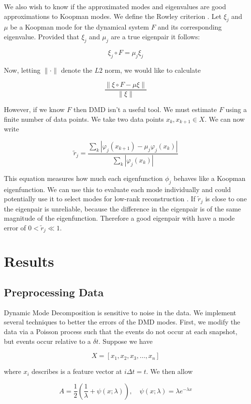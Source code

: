 We also wish to know if the approximated modes and eigenvalues are good approximations to 
Koopman modes. We define the Rowley criterion \cite{zhang2017evaluating}. Let $\xi_j$ and $\mu$ be a Koopman mode for the
 dynamical system $F$ and its corresponding eigenvalue. Provided that $\xi_j$ and $\mu_j$ are
a true eigenpair it follows:

$$
\xi_j \circ F = \mu_j \xi_j
$$

\noindent Now, letting $\|\cdot\|$ denote the $L2$ norm, we would like to calculate 

$$
\frac{\| \xi \circ F - \mu \xi \|}{\| \xi \|}
$$

\noindent However, if we know $F$ then DMD isn't a useful tool.
We must estimate $F$ using a finite number of data points. We take
two data points $x_k, x_{k+1} \in X$. We can now write 

$$
{\tilde r}_{j} = \frac{\sum_{k} |\varphi_j(x_{k+1}) - \mu_j \varphi_j(x_{k})|}{\sum_{k} |\varphi_j(x_k )|}
$$

This equation measures how much each eigenfunction $\phi_j$ behaves like a Koopman eigenfunction. We can use 
this to evaluate each mode individually and could potentially use it to select modes for low-rank reconstruction \cite{zhang2017evaluating}. If ${{\tilde r}_j}$ is close to one
the eigenpair is unreliable, because the difference in the eigenpair is of the same magnitude of the eigenfunction. Therefore a 
good eigenpair with have a mode error of $0< {{\tilde r}_j} \ll 1$.

\chapter{Results}

\section{Preprocessing Data}
Dynamic Mode Decomposition is sensitive to
 noise in the data. We implement several techniques to better the errors of the DMD modes.
  First, we modify the data via a Poisson process such that the events do not occur at each
snapshot, but events occur relative to a $\delta t$. Suppose we have 

$$
X = [x_1,x_2,x_3,\dots, x_n]
$$

\noindent where $x_i$ describes is a feature vector at $i \Delta t = t$. We then allow

$$
A = \frac{1}{2} \left( \frac{1}{\lambda} +  \psi(x;\lambda) \right), \quad \psi(x;\lambda) = \lambda e^{-\lambda x}
$$

